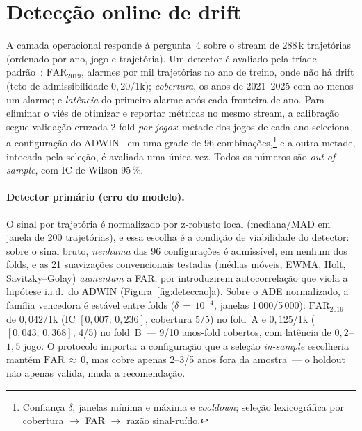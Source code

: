 \documentclass[runningheads]{llncs}
\begin{document}
\FloatBarrier
\section{Detec\c{c}\~ao online de drift}
\label{sec:deteccao}

A camada operacional responde \`a pergunta~4 sobre o stream de 288\,k trajet\'orias (ordenado por ano, jogo e trajet\'oria). Um detector \'e avaliado pela tr\'iade padr\~ao~\cite{gama2014,lu2019}: $\mathrm{FAR}_{2019}$, alarmes por mil trajet\'orias no ano de treino, onde n\~ao h\'a drift (teto de admissibilidade $0{,}20$/1k); \emph{cobertura}, os anos de 2021--2025 com ao menos um alarme; e \emph{lat\^encia} do primeiro alarme ap\'os cada fronteira de ano. Para eliminar o vi\'es de otimizar e reportar m\'etricas no mesmo stream, a calibra\c{c}\~ao segue valida\c{c}\~ao cruzada 2-fold \emph{por jogos}: metade dos jogos de cada ano seleciona a configura\c{c}\~ao do ADWIN~\cite{adwin} em uma grade de 96 combina\c{c}\~oes,\footnote{Confian\c{c}a $\delta$, janelas m\'inima e m\'axima e \emph{cooldown}; sele\c{c}\~ao lexicogr\'afica por cobertura $\to$ FAR $\to$ raz\~ao sinal-ru\'ido.} e a outra metade, intocada pela sele\c{c}\~ao, \'e avaliada uma \'unica vez. Todos os n\'umeros s\~ao \emph{out-of-sample}, com IC de Wilson 95\,\%.

\paragraph{Detector prim\'ario (erro do modelo).}
O sinal por trajet\'oria \'e normalizado por z-robusto local (mediana/MAD em janela de 200 trajet\'orias), e essa escolha \'e a condi\c{c}\~ao de viabilidade do detector: sobre o sinal bruto, \emph{nenhuma} das 96 configura\c{c}\~oes \'e admiss\'ivel, em nenhum dos folds, e as 21 suaviza\c{c}\~oes convencionais testadas (m\'edias m\'oveis, EWMA, Holt, Savitzky--Golay) \emph{aumentam} a FAR, por introduzirem autocorrela\c{c}\~ao que viola a hip\'otese i.i.d.\ do ADWIN (Figura~\ref{fig:deteccao}a). Sobre o ADE normalizado, a fam\'ilia vencedora \'e est\'avel entre folds ($\delta\,{=}\,10^{-4}$, janelas 1\,000/5\,000): $\mathrm{FAR}_{2019}$ de $0{,}042$/1k (IC $[0{,}007;\,0{,}236]$, cobertura 5/5) no fold~A e $0{,}125$/1k ($[0{,}043;\,0{,}368]$, 4/5) no fold~B~--- 9/10 anos-fold cobertos, com lat\^encia de $0{,}2$--$1{,}5$ jogo. O protocolo importa: a configura\c{c}\~ao que a sele\c{c}\~ao \emph{in-sample} escolheria mant\'em $\mathrm{FAR}\,{\approx}\,0$, mas cobre apenas 2--3/5 anos fora da amostra~--- o holdout n\~ao apenas valida, muda a recomenda\c{c}\~ao.
\end{document}
